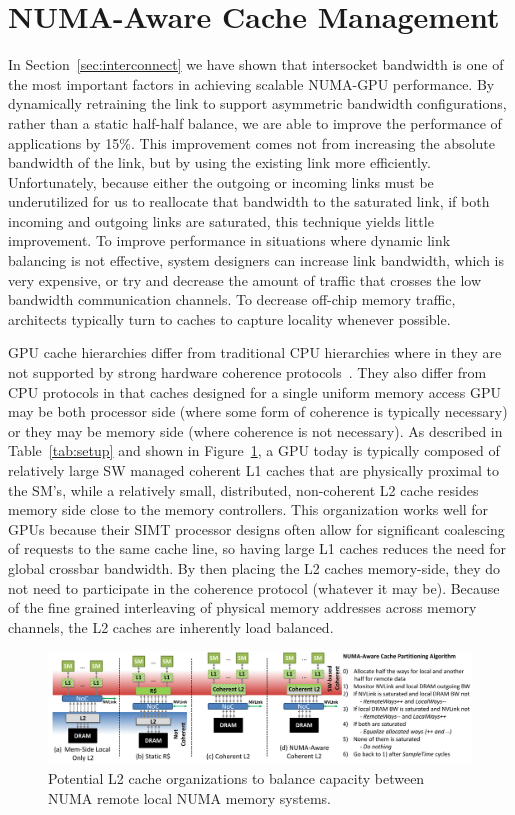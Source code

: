 \section{NUMA-Aware Cache Management}
\label{caching}
In Section~\ref{sec:interconnect} we have shown that intersocket bandwidth is one
of the most important factors in achieving scalable NUMA-GPU performance. By
dynamically retraining the link to support asymmetric bandwidth configurations,
rather than a static half-half balance, we are able to improve the performance
of applications by 15\%.  This improvement comes not from increasing the
absolute bandwidth of the link, but by using the existing link more efficiently.
Unfortunately, because either the outgoing or incoming links must be underutilized
for us to reallocate that bandwidth to the saturated link, if both incoming and
outgoing links are saturated, this technique yields little improvement.
To improve performance in situations where dynamic link balancing is not effective,
system designers can increase link bandwidth, which is very expensive,
or try and decrease the amount of traffic that crosses the low bandwidth
communication channels.  To decrease off-chip memory traffic, architects typically
turn to caches to capture locality whenever possible.

GPU cache hierarchies differ from traditional CPU hierarchies where in they are
not supported by strong hardware coherence protocols~\cite{XXX}.  They also differ
from CPU protocols in that caches designed for a single uniform memory access GPU
may be both processor side (where some form of coherence is typically necessary)
or they may be memory side (where coherence is not necessary).  As described in
Table~\ref{tab:setup} and shown in Figure~\ref{fig:cacheorg}, a GPU today is
typically composed of relatively large SW managed coherent L1 caches that are 
physically proximal to the SM's, while a relatively small, distributed, non-coherent 
L2 cache resides memory side close to the memory controllers.  This
organization works well for GPUs because their SIMT processor designs often allow
for significant coalescing of requests to the same cache line, so having large
L1 caches reduces the need for global crossbar bandwidth.  By then placing the L2
caches memory-side, they do not need to participate in the coherence protocol (whatever
it may be).  Because of the fine grained interleaving of physical memory addresses
across memory channels, the L2 caches are inherently load balanced.

\begin{figure}[t]
    \centering
    \includegraphics[width=1.0\textwidth]{figures/cache_configurations_static_dynamic.pdf}
    \caption{Potential L2 cache organizations to balance capacity between NUMA remote
    local NUMA memory systems.}
    \label{fig:cacheorg}
\end{figure}

